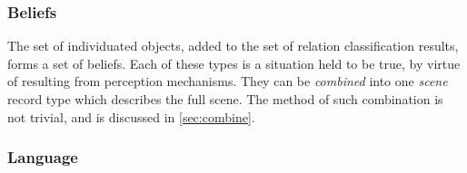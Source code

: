 \subsubsection{Beliefs}

The set of individuated objects, added to the set of relation classification results, forms a set of beliefs.
Each of these types is a situation held to be true, by virtue of resulting from perception mechanisms.
They can be \textit{combined} into one \textit{scene} record type which describes the full scene.
The method of such combination is not trivial, and is discussed in \autoref{sec:combine}.



\subsubsection{Language}

%

